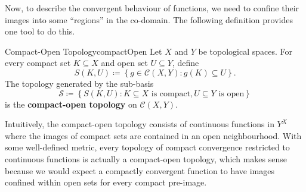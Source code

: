 \documentclass[math]{amznotes}
\theoremstyle{remark}
\begin{document}
Now, to describe the convergent behaviour of functions, we need to confine their images into some ``regions'' in the co-domain. The following definition provides one tool to do this.
\begin{dfnbox}{Compact-Open Topology}{compactOpen}
    Let $X$ and $Y$ be topological spaces. For every compact set $K \subseteq X$ and open set $U \subseteq Y$, define 
    \begin{equation*}
        S\left(K, U\right) \coloneqq \left\{g \in \mathcal{C}\left(X, Y\right) \colon g\left(K\right) \subseteq U\right\}.
    \end{equation*}
    The topology generated by the sub-basis
    \begin{equation*}
        \mathcal{S} \coloneqq \left\{S\left(K, U\right) \colon K \subseteq X \textrm{ is compact}, U \subseteq Y \textrm{ is open}\right\}
    \end{equation*}
    is the {\color{red} \textbf{compact-open topology}} on $\mathcal{C}\left(X, Y\right)$.
\end{dfnbox}
Intuitively, the compact-open topology consists of continuous functions in $Y^X$ where the images of compact sets are contained in an open neighbourhood. With some well-defined metric, every topology of compact convergence restricted to continuous functions is actually a compact-open topology, which makes sense because we would expect a compactly convergent function to have images confined within open sets for every compact pre-image.
\end{document}
